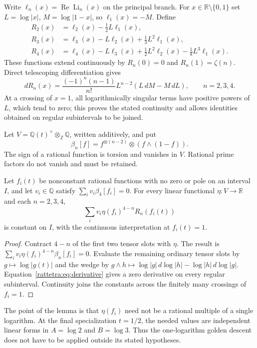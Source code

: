 Write $\ell_n(x)=\operatorname{Re}\operatorname{Li}_n(x)$ on the
principal branch. For $x\in\mathbb R\setminus\{0,1\}$ set
$L=\log|x|$, $M=\log|1-x|$, so $\ell_1(x)=-M$. Define
\begin{align*}
R_2(x)&=\ell_2(x)-\tfrac12L\ell_1(x),\\
R_3(x)&=\ell_3(x)-L\ell_2(x)+\tfrac13L^2\ell_1(x),\\
R_4(x)&=\ell_4(x)-L\ell_3(x)
                +\tfrac12L^2\ell_2(x)-\tfrac18L^3\ell_1(x).
\end{align*}
These functions extend continuously by $R_n(0)=0$ and
$R_n(1)=\zeta(n)$. Direct telescoping differentiation gives
\begin{equation}
 dR_n(x)=\frac{(-1)^n(n-1)}{n!}
 L^{n-2}(L\,dM-M\,dL),\qquad n=2,3,4.
\label{rattetra:eq:derivative}
\end{equation}
At a crossing of $x=1$, all logarithmically singular terms have positive
powers of $L$, which tend to zero; this proves the stated continuity and
allows identities obtained on regular subintervals to be joined.

Let $V=\mathbb Q(t)^\times\otimes_{\mathbb Z}\mathbb Q$, written
additively, and put
\[
 \beta_n[f]=f^{\otimes(n-2)}\otimes(f\wedge(1-f)).
\]
The sign of a rational function is torsion and vanishes in $V$.
Rational prime factors do not vanish and must be retained.

\begin{lemma}
\label{rattetra:lem:descent}
Let $f_i(t)$ be nonconstant rational functions with no zero or pole
on an interval $I$, and let $v_i\in\mathbb Q$ satisfy
$\sum_i v_i\beta_4[f_i]=0$. For every linear functional
$\eta:V\to\mathbb R$ and each $n=2,3,4$,
\[
 \sum_i v_i\eta(f_i)^{4-n}R_n(f_i(t))
\]
is constant on $I$, with the continuous interpretation at $f_i(t)=1$.
\end{lemma}

\begin{proof}
Contract $4-n$ of the first two tensor slots with $\eta$.
The result is $\sum_i v_i\eta(f_i)^{4-n}\beta_n[f_i]=0$.
Evaluate the remaining ordinary tensor slots by $g\mapsto\log|g(t)|$
and the wedge by
$g\wedge h\mapsto\log|g|\,d\log|h|-\log|h|\,d\log|g|$.
Equation~\eqref{rattetra:eq:derivative} gives a zero derivative on every
regular subinterval. Continuity joins the constants across the finitely
many crossings of $f_i=1$.
\end{proof}

The point of the lemma is that $\eta(f_i)$ need not be a rational
multiple of a single logarithm. At the final specialization $t=1/2$,
the needed values are independent linear forms in $A=\log2$ and
$B=\log3$. Thus the one-logarithm golden descent does not have to be
applied outside its stated hypotheses.

